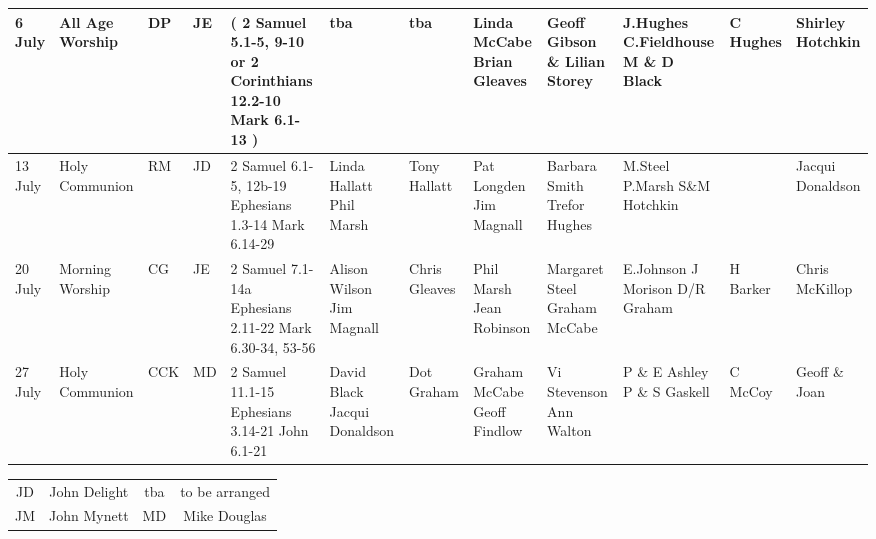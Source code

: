 \documentclass[10pt,a4paper]{article}
\begin{document}
\begin{center}
{\begin{tabular}{|p{1.6cm}|p{1.4cm}|p{0.6cm}|p{0.6cm}|p{3.2cm}|p{2cm}|p{1.5cm}|p{2cm}|p{2.0cm}|p{2.4cm}
|p{1.6cm}|p{1.6cm}|}
6 July & All Age Worship & DP & JE & %
{\footnotesize (
2 Samuel 5.1-5, 9-10 or
2 Corinthians 12.2-10
Mark 6.1-13
)}  &    tba & 
tba & Linda McCabe  Brian Gleaves & 
Geoff  Gibson \& Lilian Storey &
J.Hughes \linebreak C.Fieldhouse \linebreak M \& D Black
& C Hughes  & Shirley Hotchkin \\
\hline
13 July & Holy Communion
& RM & JD &    
2 Samuel 6.1-5, 12b-19 %
Ephesians 1.3-14 \linebreak
Mark 6.14-29
& Linda Hallatt Phil Marsh  & 
Tony \linebreak Hallatt & Pat Longden  Jim Magnall & 
Barbara Smith \linebreak Trefor Hughes &
M.Steel P.Marsh \linebreak S\&M Hotchkin
&   & Jacqui Donaldson \\
\hline
20 July & Morning Worship  
&  CG & JE & 
2 Samuel 7.1-14a \linebreak
Ephesians 2.11-22 \linebreak
Mark 6.30-34, 53-56
    &  Alison Wilson Jim Magnall &
Chris Gleaves &  Phil Marsh \linebreak Jean Robinson & 
Margaret Steel \linebreak Graham McCabe &
E.Johnson   \linebreak J Morison  \linebreak D/R Graham
& H Barker  &  Chris \linebreak McKillop \\
\hline
27 July & Holy Communion
 & CCK  & MD & 
2 Samuel 11.1-15  \linebreak
Ephesians 3.14-21 \linebreak
John 6.1-21 
    & David Black \linebreak Jacqui Donaldson  & 
Dot Graham &  Graham McCabe \linebreak Geoff Findlow & 
Vi Stevenson Ann Walton &
P \& E Ashley \linebreak P \& S Gaskell
& C McCoy  &   Geoff \& Joan \\
\hline
\end{tabular}
}

\vspace{1em}
\begin{tabular}{|c|c|c|c|}\hline
JD & John Delight &  tba & to be arranged  \\ %
 JM & John Mynett & MD & Mike Douglas \\
   \hline
\end{tabular}
\end{center}
\end{document}
